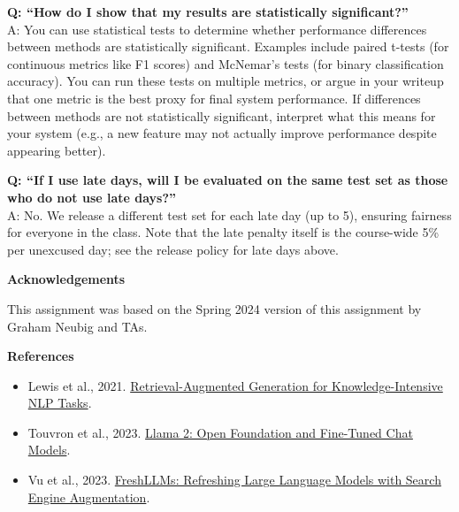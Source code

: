 \documentclass[11pt]{article}
\newcommand{\problem}[1]{%
  \vspace{1em}
  \noindent\colorbox{headerblue}{\parbox{\dimexpr\textwidth-2\fboxsep}{%
    \vspace{2pt}\textbf{\large #1}\vspace{2pt}}}
  \vspace{0.6em}
}
\begin{document}
\vspace{0.6em}
\noindent\textbf{Q: ``How do I show that my results are statistically significant?''}\\
A: You can use statistical tests to determine whether performance differences between methods are
statistically significant. Examples include paired t-tests (for continuous metrics like F1 scores) and
McNemar's tests (for binary classification accuracy). You can run these tests on multiple metrics, or
argue in your writeup that one metric is the best proxy for final system performance. If differences
between methods are not statistically significant, interpret what this means for your system (e.g., a
new feature may not actually improve performance despite appearing better).

\vspace{0.6em}
\noindent\textbf{Q: ``If I use late days, will I be evaluated on the same test set as those who do not
use late days?''}\\
A: No. We release a different test set for each late day (up to 5), ensuring fairness for everyone
in the class. Note that the late penalty itself is the course-wide 5\% per unexcused day; see the
release policy for late days above.

\problem{Acknowledgements}

\noindent This assignment was based on the Spring 2024 version of this assignment by Graham Neubig and
TAs.

\problem{References}

\begin{itemize}[nosep, leftmargin=2em]
  \item Lewis et al., 2021. \href{https://arxiv.org/abs/2005.11401}{Retrieval-Augmented Generation for
    Knowledge-Intensive NLP Tasks}.
  \item Touvron et al., 2023. \href{https://arxiv.org/abs/2307.09288}{Llama 2: Open Foundation and
    Fine-Tuned Chat Models}.
  \item Vu et al., 2023. \href{https://arxiv.org/abs/2310.03214}{FreshLLMs: Refreshing Large Language
    Models with Search Engine Augmentation}.
\end{itemize}
\end{document}

